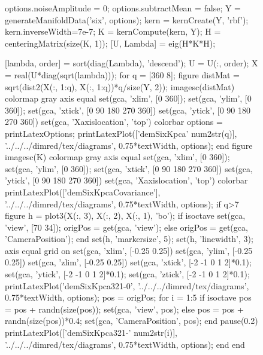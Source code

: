 
 
\begin{figure}
  \begin{matlab}
    options.noiseAmplitude = 0;
    options.subtractMean = false;
    Y = generateManifoldData('six', options);
    kern = kernCreate(Y, 'rbf');
    kern.inverseWidth=7e-7;
    K = kernCompute(kern, Y);
    H = centeringMatrix(size(K, 1));
    [U, Lambda] = eig(H*K*H);

    [lambda, order] = sort(diag(Lambda), 'descend');
    U = U(:, order);
    X = real(U*diag(sqrt(lambda)));
    for q = [360 8];
      figure
      distMat = sqrt(dist2(X(:, 1:q), X(:, 1:q))*q/size(Y, 2));
      imagesc(distMat)
      colormap gray
      axis equal
      set(gca, 'xlim', [0 360]);
      set(gca, 'ylim', [0 360]);
      set(gca, 'xtick', [0 90 180 270 360])
      set(gca, 'ytick', [0 90 180 270 360])
      set(gca, 'Xaxislocation', 'top')
      colorbar
      options = printLatexOptions;
      printLatexPlot(['demSixKpca' num2str(q)], '../../../dimred/tex/diagrams', 0.75*textWidth, options);
    end  
    figure
    imagesc(K)
    colormap gray
    axis equal
    set(gca, 'xlim', [0 360]);
    set(gca, 'ylim', [0 360]);
    set(gca, 'xtick', [0 90 180 270 360])
    set(gca, 'ytick', [0 90 180 270 360])
    set(gca, 'Xaxislocation', 'top')
    colorbar
    printLatexPlot(['demSixKpcaCovariance'], '../../../dimred/tex/diagrams', 0.75*textWidth, options);
    if q>7
      figure
      h = plot3(X(:, 3), X(:, 2), X(:, 1), 'bo');
      if isoctave
        set(gca, 'view', [70 34]);
        origPos = get(gca, 'view');
      else
        origPos = get(gca, 'CameraPosition');
      end
      set(h, 'markersize', 5);
      set(h, 'linewidth', 3);
      axis equal
      grid on
      set(gca, 'xlim', [-0.25 0.25])
      set(gca, 'ylim', [-0.25 0.25])
      set(gca, 'zlim', [-0.25 0.25])
      set(gca, 'xtick', [-2 -1 0 1 2]*0.1);
      set(gca, 'ytick', [-2 -1 0 1 2]*0.1);
      set(gca, 'ztick', [-2 -1 0 1 2]*0.1);
      printLatexPlot('demSixKpca321-0', '../../../dimred/tex/diagrams', 0.75*textWidth, options);
      pos = origPos;
      for i = 1:5
        if isoctave
          pos = pos + randn(size(pos));
          set(gca, 'view', pos);
        else
          pos = pos + randn(size(pos))*0.4;
          set(gca, 'CameraPosition', pos);
        end
        pause(0.2)
        printLatexPlot(['demSixKpca321-' num2str(i)], '../../../dimred/tex/diagrams', 0.75*textWidth, options);
      end
    end
  \end{matlab}
  \begin{centering}
    \subfigure[]{}
    \hfill
    \subfigure[]{}
  \end{centering}


\end{figure}
